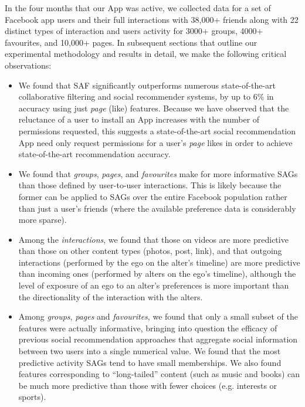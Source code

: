 In the four months that our App was active, we collected data for a
set of Facebook app users and their full interactions with 38,000+
friends along with 22 distinct types of interaction and users activity
for 3000+ groups, 4000+ favourites, and 10,000+ pages.  In subsequent
sections that outline our experimental methodology and results in
detail, we make the following critical observations:
\begin{itemize}
\item We found that SAF significantly 
outperforms numerous state-of-the-art collaborative filtering and social recommender 
systems, by up to 6\% in accuracy using just \emph{page} (like) features.
Because we have observed that the reluctance of a user to install an App increases with the number
of permissions requested, this suggests a state-of-the-art social recommendation App 
need only request permissions for a user's \emph{page} likes in order to achieve
state-of-the-art recommendation accuracy.
\item We found that \emph{groups}, \emph{pages}, and \emph{favourites} make for more informative
SAGs than those defined by user-to-user interactions.  This is likely because the former can be
applied to SAGs over the entire Facebook population 
rather than just a user's friends (where the available preference data is considerably more sparse).
\item Among the \emph{interactions}, we found that those on videos are more predictive than those on other content types (photos, post, link), and that outgoing interactions (performed by the ego on the alter's timeline) 
are more predictive than incoming ones (performed by alters on the
ego's timeline), although the level of exposure of an ego to an
alter's preferences is more important than the directionality of the
interaction with the alters.
\item %
Among {\em groups}, {\em pages} and {\em favourites}, we found that only
a small subset of the features were actually informative, bringing into question the efficacy of 
previous social recommendation approaches that aggregate social information between
two users into a single numerical value.  We found that the most  
predictive activity SAGs tend to have small memberships.  We also found features
corresponding to ``long-tailed'' content (such as music and books)
can be much more predictive than those with fewer choices 
(e.g. interests or sports). 
\end{itemize}
